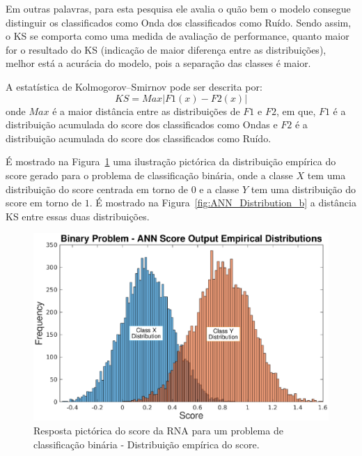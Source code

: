 Em outras palavras, para esta pesquisa ele avalia o quão bem o modelo consegue distinguir os classificados como Onda dos classificados como Ruído. Sendo assim, o KS se comporta como uma medida de avaliação de performance, quanto maior for o resultado do KS (indicação de maior diferença entre as distribuições), melhor está a acurácia do modelo, pois a separação das classes é maior. 

A estatística de Kolmogorov–Smirnov pode ser descrita por: 
\begin{equation}
KS = Max|F1(x)−F2(x)|
\label{eq:kolmogorov}
\end{equation}
onde $Max$ é a maior distância entre as distribuições de $F1$ e $F2$, em que, $F1$ é a distribuição acumulada do score dos classificados como Ondas e $F2$ é a distribuição acumulada do score dos classificados como Ruído.

É mostrado na Figura~\ref{fig:ANN_Distribution_a} uma ilustração pictórica da distribuição empírica do score gerado para o problema de classificação binária, onde a classe $X$ tem uma distribuição do score centrada em torno de $0$ e a classe $Y$ tem uma distribuição do score em torno de $1$. É mostrado na Figura~\ref{fig:ANN_Distribution_b} a distância KS entre essas duas distribuições.

\begin{figure}[H]
\centering
\includegraphics[width=1\textwidth]{figuras/ANNScore_Output.eps}
\caption{Resposta pictórica do score da RNA para um problema de classificação binária - Distribuição empírica do score.}
\label{fig:ANN_Distribution_a}
\end{figure}


